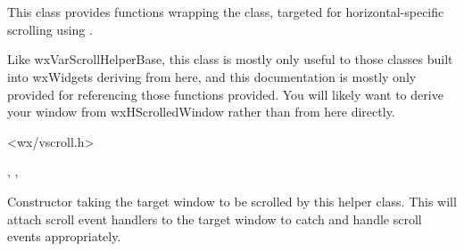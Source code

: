 
\section{}\label{wxvarhscrollhelper}

This class provides functions wrapping the 
 class, targeted for
horizontal-specific scrolling using .

Like wxVarScrollHelperBase, this class is mostly only useful to those classes
built into wxWidgets deriving from here, and this documentation is mostly
only provided for referencing those functions provided. You will likely want
to derive your window from wxHScrolledWindow rather than from here directly.




<wx/vscroll.h>




,
\rtfsp{},
\rtfsp{}



\label{wxvarhscrollhelperwxvarhscrollhelper}


Constructor taking the target window to be scrolled by this helper class.
This will attach scroll event handlers to the target window to catch and
handle scroll events appropriately.


\label{wxvarhscrollhelperestimatetotalwidth}

